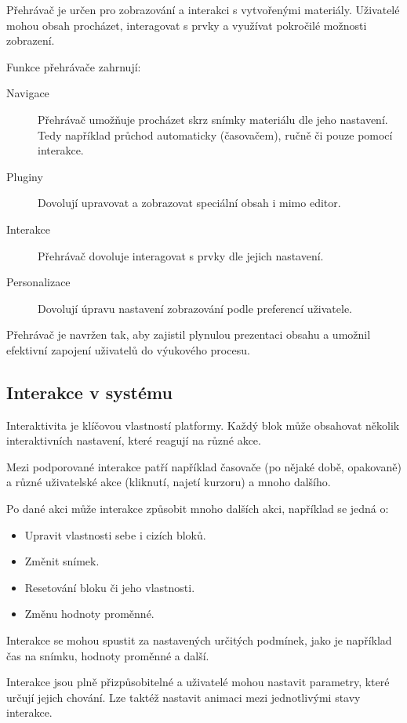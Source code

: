 Přehrávač je určen pro zobrazování a interakci s vytvořenými materiály. 
Uživatelé mohou obsah procházet, interagovat s prvky a využívat pokročilé možnosti zobrazení.

Funkce přehrávače zahrnují:

\begin{description}
    \item[Navigace] Přehrávač umožňuje procházet skrz snímky materiálu dle jeho nastavení. Tedy například průchod automaticky (časovačem), ručně či pouze pomocí interakce.
    \item[Pluginy] Dovolují upravovat a zobrazovat speciální obsah i mimo editor.
    \item[Interakce] Přehrávač dovoluje interagovat s prvky dle jejich nastavení.
    \item[Personalizace] Dovolují úpravu nastavení zobrazování podle preferencí uživatele.
\end{description}

Přehrávač je navržen tak, aby zajistil plynulou prezentaci obsahu a umožnil efektivní zapojení uživatelů do výukového procesu.

\subsection{Interakce v systému}

Interaktivita je klíčovou vlastností platformy.
Každý blok může obsahovat několik interaktivních nastavení, které reagují na různé akce. 

Mezi podporované interakce patří například časovače (po nějaké době, opakovaně) a různé uživatelské akce (kliknutí, najetí kurzoru) a mnoho dalšího. 

Po dané akci může interakce způsobit mnoho dalších akci, například se jedná o:

\begin{itemize}
    \item Upravit vlastnosti sebe i cizích bloků.
    \item Změnit snímek.
    \item Resetování bloku či jeho vlastnosti.
    \item Změnu hodnoty proměnné. 
\end{itemize}

Interakce se mohou spustit za nastavených určitých podmínek, jako je například čas na snímku, hodnoty proměnné a další.

Interakce jsou plně přizpůsobitelné a uživatelé mohou nastavit parametry, které určují jejich chování.
Lze taktéž nastavit animaci mezi jednotlivými stavy interakce.

